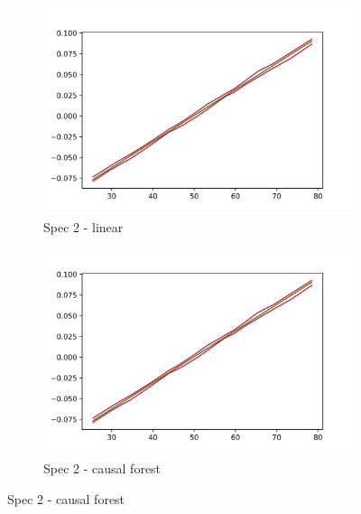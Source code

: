 \begin{figure}[h]
    \begin{subfigure}{0.5\linewidth}
        \includegraphics[width=\linewidth]{figures/ALE/chFDexp/spec2_linear_AGE.png}
        \caption{Spec 2 - linear}
    \end{subfigure}%
    \begin{subfigure}{0.5\linewidth}
        \includegraphics[width=\linewidth]{figures/ALE/chFDexp/spec2_linear_AGE.png}
        \caption{Spec 2 - causal forest}
    \end{subfigure}


\end{figure}
